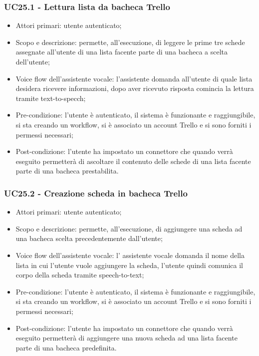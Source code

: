 \subsubsection{UC25.1 - Lettura lista da bacheca Trello}
\begin{itemize}
	\item  Attori primari: utente autenticato;
	\item  Scopo e descrizione: permette, all'esecuzione, di leggere le prime tre schede assegnate all'utente di una lista facente parte di una bacheca a scelta dell'utente;
	\item  Voice flow dell'assistente vocale: l'assistente domanda all'utente di quale lista desidera ricevere informazioni, dopo aver ricevuto risposta comincia la lettura tramite text-to-specch;
	\item  Pre-condizione: l'utente è autenticato, il sistema è funzionante e raggiungibile, si sta creando un workflow, si è associato un account Trello e si sono forniti i permessi necessari;
	\item  Post-condizione: l'utente ha impostato un connettore che quando verrà eseguito permetterà di ascoltare il contenuto delle schede di una lista facente parte di una bacheca prestabilita.
\end{itemize}
\subsubsection{UC25.2 - Creazione scheda in bacheca Trello}
\begin{itemize}
	\item  Attori primari: utente autenticato;
	\item  Scopo e descrizione: permette, all'esecuzione, di aggiungere una scheda ad una bacheca scelta precedentemente dall'utente;
	\item  Voice flow dell'assistente vocale: l' assistente vocale domanda il nome della lista in cui l'utente vuole aggiungere la scheda, l'utente quindi comunica il corpo della scheda tramite speech-to-text;
	\item  Pre-condizione: l'utente è autenticato, il sistema è funzionante e raggiungibile, si sta creando un workflow, si è associato un account Trello e si sono forniti i permessi necessari;
	\item  Post-condizione: l'utente ha impostato un connettore che quando verrà eseguito permetterà di aggiungere una nuova scheda ad una lista facente parte di una bacheca predefinita.
\end{itemize}
